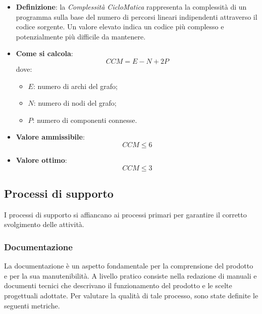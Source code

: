 \hypertarget{18M}{}
\begin{itemize}
	\item \textbf{Definizione}: la \textit{Complessità CicloMatica} rappresenta la complessità di un programma sulla base del numero di percorsi lineari indipendenti attraverso il codice sorgente. Un valore elevato indica un codice più complesso e potenzialmente più difficile da mantenere.
	\item \textbf{Come si calcola}: \begin{equation*}CCM = E - N + 2P\end{equation*} dove:
		\begin{itemize}
			\item $E$: numero di archi del grafo;
			\item $N$: numero di nodi del grafo;
			\item $P$: numero di componenti connesse.
		\end{itemize}
	\item \textbf{Valore ammissibile}: \begin{equation*}CCM \leq 6\end{equation*}
	\item \textbf{Valore ottimo}: \begin{equation*}CCM \leq 3\end{equation*}
\end{itemize}



\subsection{Processi di supporto}
I processi di supporto si affiancano ai processi primari per garantire il corretto svolgimento delle attività.

\subsubsection{Documentazione}
La documentazione è un aspetto fondamentale per la comprensione del prodotto e per la sua manutenibilità. A livello pratico consiste nella redazione di manuali e documenti tecnici che descrivano il funzionamento del prodotto e le scelte progettuali adottate. Per valutare la qualità di tale processo, sono state definite le seguenti metriche.


